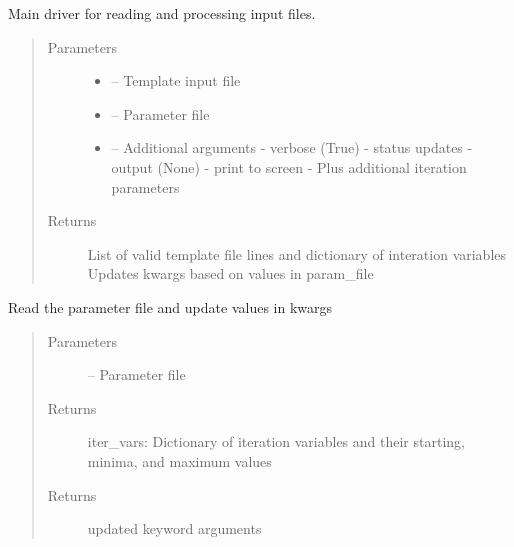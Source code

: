 \documentclass[letterpaper,10pt,english]{sphinxmanual}
\begin{document}
\begin{fulllineitems}
\label{\detokenize{readinputs:critops.readinputs.readmain}}
Main driver for reading and processing input files.
\begin{quote}\begin{description}
\item[{Parameters}] \leavevmode\begin{itemize}
\item {} 
 -- Template input file

\item {} 
 -- Parameter file

\item {} 
 -- Additional arguments
- verbose (True) - status updates
- output (None) - print to screen
- Plus additional iteration parameters

\end{itemize}

\item[{Returns}] \leavevmode
List of valid template file lines and dictionary of interation variables
Updates kwargs based on values in param\_file

\end{description}\end{quote}

\end{fulllineitems}


\begin{fulllineitems}
\label{\detokenize{readinputs:critops.readinputs.read_param}}
Read the parameter file and update values in kwargs
\begin{quote}\begin{description}
\item[{Parameters}] \leavevmode
{} -- Parameter file

\item[{Returns}] \leavevmode
iter\_vars: Dictionary of iteration variables and their starting, minima, and maximum values

\item[{Returns}] \leavevmode
updated keyword arguments

\end{description}\end{quote}

\end{fulllineitems}
\end{document}
